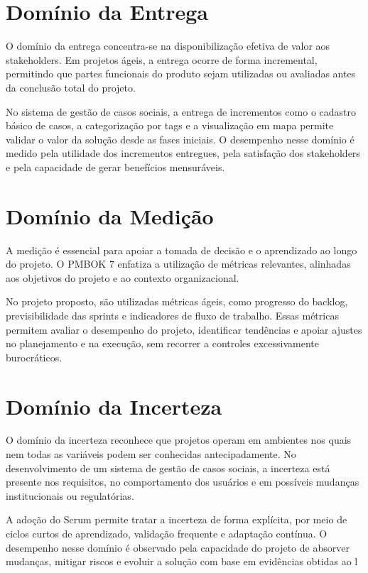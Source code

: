 \section{Domínio da Entrega}

O domínio da entrega concentra-se na disponibilização efetiva de valor aos stakeholders. Em projetos ágeis, a entrega ocorre de forma incremental, permitindo que partes funcionais do produto sejam utilizadas ou avaliadas antes da conclusão total do projeto.

No sistema de gestão de casos sociais, a entrega de incrementos como o cadastro básico de casos, a categorização por tags e a visualização em mapa permite validar o valor da solução desde as fases iniciais. O desempenho nesse domínio é medido pela utilidade dos incrementos entregues, pela satisfação dos stakeholders e pela capacidade de gerar benefícios mensuráveis.

\section{Domínio da Medição}

A medição é essencial para apoiar a tomada de decisão e o aprendizado ao longo do projeto. O PMBOK 7 enfatiza a utilização de métricas relevantes, alinhadas aos objetivos do projeto e ao contexto organizacional.

No projeto proposto, são utilizadas métricas ágeis, como progresso do backlog, previsibilidade das sprints e indicadores de fluxo de trabalho. Essas métricas permitem avaliar o desempenho do projeto, identificar tendências e apoiar ajustes no planejamento e na execução, sem recorrer a controles excessivamente burocráticos.

\section{Domínio da Incerteza}

O domínio da incerteza reconhece que projetos operam em ambientes nos quais nem todas as variáveis podem ser conhecidas antecipadamente. No desenvolvimento de um sistema de gestão de casos sociais, a incerteza está presente nos requisitos, no comportamento dos usuários e em possíveis mudanças institucionais ou regulatórias.

A adoção do Scrum permite tratar a incerteza de forma explícita, por meio de ciclos curtos de aprendizado, validação frequente e adaptação contínua. O desempenho nesse domínio é observado pela capacidade do projeto de absorver mudanças, mitigar riscos e evoluir a solução com base em evidências obtidas ao l

